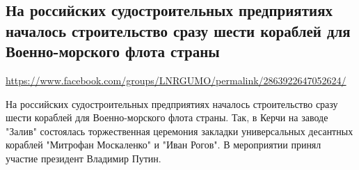  
 
\subsection{На российских судостроительных предприятиях началось строительство сразу шести кораблей для Военно-морского флота страны}
\label{sec:21_07_2020.fb.lnr.14}
\url{https://www.facebook.com/groups/LNRGUMO/permalink/2863922647052624/}

  
На российских судостроительных предприятиях началось строительство сразу шести
кораблей для Военно-морского флота страны. Так, в Керчи на заводе "Залив"
состоялась торжественная церемония закладки универсальных десантных кораблей
"Митрофан Москаленко" и "Иван Рогов". В мероприятии принял участие президент
Владимир Путин.
  

